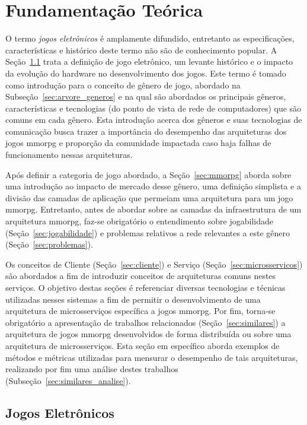 \chapter{Fundamentação Teórica}
\label{cap2}


O termo \textit{jogos eletrônicos} é amplamente difundido, entretanto as especificações, características e histórico deste termo não são de conhecimento popular.
%
A Seção~\ref{sec:jogos_eletronicos} trata a definição de jogo eletrônico, um levante histórico e o impacto da evolução do hardware no desenvolvimento dos jogos.
%
Este termo é tomado como introdução para o conceito de gênero de jogo, abordado na Subseção~\ref{sec:arvore_generos} e na qual são abordados os principais gêneros, características e tecnologias (do ponto de vista de rede de computadores) que são comuns em cada gênero.
%
Esta introdução acerca dos gêneros e suas tecnologias de comunicação busca trazer a importância do desempenho das arquiteturas dos jogos \ac{mmorpg} e proporção da comunidade impactada caso haja falhas de funcionamento nessas arquiteturas.



Após definir a categoria de jogo abordado, a Seção~\ref{sec:mmorpg} aborda sobre uma introdução ao impacto de mercado desse gênero, uma definição simplista e a divisão das camadas de aplicação que permeiam uma arquitetura para um jogo \ac{mmorpg}.
%
Entretanto, antes de abordar sobre as camadas da infraestrutura de um arquitetura \ac{mmorpg}, faz-se obrigatório o entendimento sobre jogabilidade (Seção~\ref{sec:jogabilidade}) e problemas relativos a rede relevantes a este gênero (Seção~\ref{sec:problemas}).


Os conceitos de Cliente (Seção~\ref{sec:cliente}) e Serviço (Seção~\ref{sec:microsservicos}) são abordados a fim de introduzir conceitos de arquiteturas comuns nestes serviços.
%
O objetivo destas seções é referenciar diversas tecnologias e técnicas utilizadas nesses sistemas a fim de permitir o desenvolvimento de uma arquitetura de microsserviços específica a jogos \ac{mmorpg}.
%
Por fim, torna-se obrigatório a apresentação de trabalhos relacionados (Seção~\ref{sec:similares}) a arquitetura de jogos \ac{mmorpg} desenvolvidos de forma distribuída ou sobre uma arquitetura de microsserviços.
%
Esta seção em específico aborda exemplos de métodos e métricas utilizadas para mensurar o desempenho de tais arquiteturas, realizando por fim uma análise destes trabalhos (Subseção~\ref{sec:similares_analise}).


\section{Jogos Eletrônicos}
\label{sec:jogos_eletronicos}


